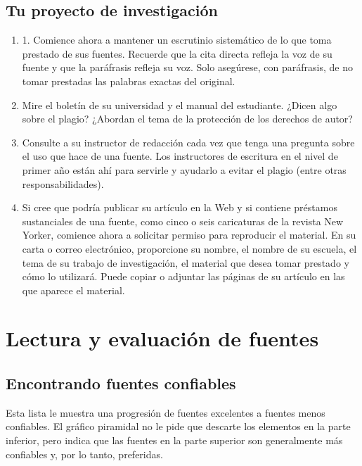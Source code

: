 \section{Tu proyecto de investigación}
\begin{enumerate}[1.]
    \item 1. Comience ahora a mantener un escrutinio sistemático de lo que toma prestado de sus fuentes. Recuerde que la cita directa refleja la voz de su fuente y que la paráfrasis refleja su voz. Solo asegúrese, con paráfrasis, de no tomar prestadas las palabras exactas del original.  
    \item Mire el boletín de su universidad y el manual del estudiante. ¿Dicen algo sobre el plagio? ¿Abordan el tema de la protección de los derechos de autor? 
    \item Consulte a su instructor de redacción cada vez que tenga una pregunta sobre el uso que hace de una fuente. Los instructores de escritura en el nivel de primer año están ahí para servirle y ayudarlo a evitar el plagio (entre otras responsabilidades). 
    \item Si cree que podría publicar su artículo en la Web y si contiene préstamos sustanciales de una fuente, como cinco o seis caricaturas de la revista New Yorker, comience ahora a solicitar permiso para reproducir el material. En su carta o correo electrónico, proporcione su nombre, el nombre de su escuela, el tema de su trabajo de investigación, el material que desea tomar prestado y cómo lo utilizará. Puede copiar o adjuntar las páginas de su artículo en las que aparece el material.
\end{enumerate}



\chapter{Lectura y evaluación de fuentes}

\section{Encontrando fuentes confiables}

Esta lista le muestra una progresión de fuentes excelentes a fuentes menos confiables. El gráfico piramidal no le pide que descarte los elementos en la parte inferior, pero indica que las fuentes en la parte superior son generalmente más confiables y, por lo tanto, preferidas.

